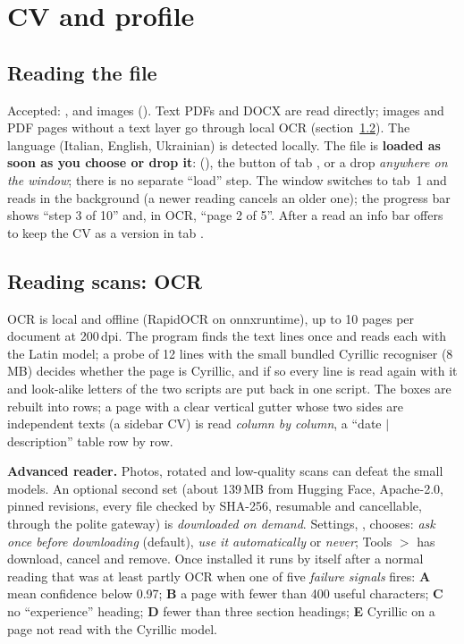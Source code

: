 \chapter{CV and profile}\label{ch:cv}

\section{Reading the file}
Accepted: ,  and images ().
Text PDFs and DOCX are read directly; images and PDF pages without a text layer go
through local OCR (section~\ref{sec:ocr}). The language (Italian, English, Ukrainian) is
detected locally. The file is \textbf{loaded as soon as you choose or drop it}:
 (), the  button of tab
, or a drop \emph{anywhere on the window}; there is no separate ``load''
step. The window switches to tab~1 and reads in the background (a newer reading cancels an older
one); the progress bar shows ``step 3 of 10'' and, in OCR, ``page 2 of 5''. After a read an info
bar offers to keep the CV as a version in tab .

\section{Reading scans: OCR}\label{sec:ocr}
OCR is local and offline (RapidOCR on onnxruntime), up to 10 pages per document at 200\,dpi.
The program finds the text lines once and reads each with the Latin model; a probe of 12 lines
with the small bundled Cyrillic recogniser (8\,MB) decides whether the page is Cyrillic, and if so
every line is read again with it and look-alike letters of the two scripts are put back in one
script. The boxes are rebuilt into rows; a page with a clear vertical gutter whose two sides are
independent texts (a sidebar CV) is read \emph{column by column}, a ``date $|$ description''
table row by row.

\textbf{Advanced reader.} Photos, rotated and low-quality scans can defeat the small models. An
optional second set (about 139\,MB from Hugging Face, Apache-2.0, pinned revisions, every file
checked by SHA-256, resumable and cancellable, through the polite gateway) is \emph{downloaded on
demand}. Settings, , chooses: \emph{ask once before downloading} (default), \emph{use it
automatically} or \emph{never}; Tools $>$  has download, cancel and remove.
Once installed it runs by itself after a normal reading that was at least partly OCR when one of five
\emph{failure signals} fires: \textbf{A} mean confidence below 0.97; \textbf{B} a page with fewer
than 400 useful characters; \textbf{C} no ``experience'' heading; \textbf{D} fewer than three
section headings; \textbf{E} Cyrillic on a page not read with the Cyrillic model.

